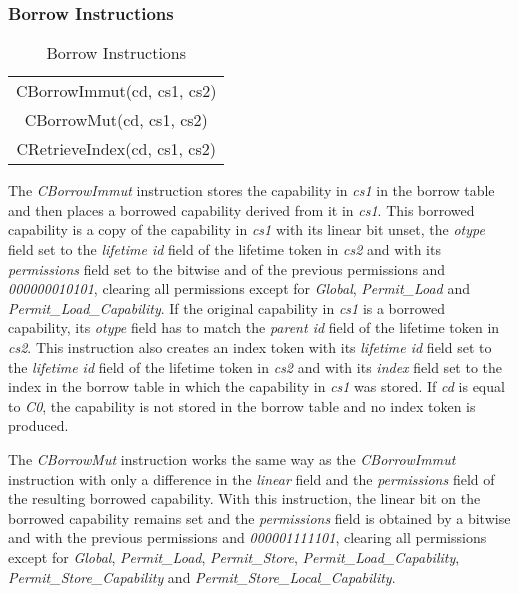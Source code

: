 \subsubsection{Borrow Instructions}

\begin{table}[h]
\centering
\begin{tabular}{| c |}
\hline
 CBorrowImmut(cd, cs1, cs2) \\
 CBorrowMut(cd, cs1, cs2) \\
 CRetrieveIndex(cd, cs1, cs2) \\
\hline
\end{tabular}
\caption{Borrow Instructions}
\label{table:borrowedinstsborrow}
\end{table}

The \textit{CBorrowImmut} instruction stores the capability in \textit{cs1} in the borrow table and then places a borrowed capability derived from it in \textit{cs1}. This borrowed capability is a copy of the capability in \textit{cs1} with its linear bit unset, the \textit{otype} field set to the \textit{lifetime id} field of the lifetime token in \textit{cs2} and with its \textit{permissions} field set to the bitwise and of the previous permissions and \textit{000000010101}, clearing all permissions except for \textit{Global}, \textit{Permit\_Load} and \textit{Permit\_Load\_Capability}.
If the original capability in \textit{cs1} is a borrowed capability, its \textit{otype} field has to match the \textit{parent id} field of the lifetime token in \textit{cs2}.
This instruction also creates an index token with its \textit{lifetime id} field set to the \textit{lifetime id} field of the lifetime token in \textit{cs2} and with its \textit{index} field set to the index in the borrow table in which the capability in \textit{cs1} was stored.
If \textit{cd} is equal to \textit{C0}, the capability is not stored in the borrow table and no index token is produced.

The \textit{CBorrowMut} instruction works the same way as the \textit{CBorrowImmut} instruction with only a difference in the \textit{linear} field and the \textit{permissions} field of the resulting borrowed capability. With this instruction, the linear bit on the borrowed capability remains set and the \textit{permissions} field is obtained by a bitwise and with the previous permissions and \textit{000001111101}, clearing all permissions except for \textit{Global}, \textit{Permit\_Load}, \textit{Permit\_Store}, \textit{Permit\_Load\_Capability}, \textit{Permit\_Store\_Capability} and \textit{Permit\_Store\_Local\_Capability}.

